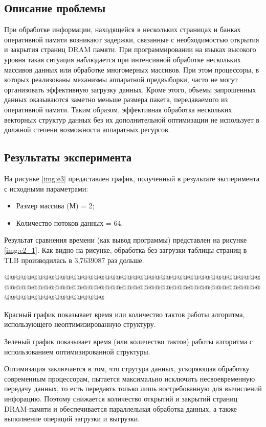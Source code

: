 \subsection*{Описание проблемы}
При обработке информации, находящейся в нескольких страницах и банках оперативной памяти возникают задержки, связанные с необходимостью открытия и закрытия страниц DRAM памяти. При программировании на языках высокого уровня такая ситуация наблюдается при интенсивной обработке нескольких массивов данных или обработке многомерных массивов. При этом процессоры, в которых реализованы механизмы аппаратной предвыборки, часто не могут организовать эффективную загрузку данных. Кроме этого, объемы запрошенных данных оказываются заметно меньше размера пакета, передаваемого из оперативной памяти. Таким образом, эффективная обработка нескольких векторных структур данных без их дополнительной оптимизации не использует в должной степени возможности аппаратных ресурсов. 

\subsection*{Результаты эксперимента}
На рисунке \ref{img:e3} предаставлен график, полученный в результате эксперимента с исходными параметрами:
\begin{itemize}
	\item Размер массива (М) = 2;
	\item Количество потоков данных = 64.
\end{itemize}


Результат сравнения времени (как вывод программы) представлен на рисунке \ref{img:e2_1}. Как видно на рисунке, обработка без загрузки таблицы страниц в TLB производилась в 3,7639087 раз дольше.

@@@@@@@@@@@@@@@@@@@@@@@@@@@@@@@@@@@@@@@@@@@@@@@@@@@@@@@@@@@@@@@@@@@@@@@@@@@@@@@@@@@@@@@@@@@@@@@@@@@@@@@@@@@@@@

Красный график показывает время или количество тактов работы алгоритма, использующего неоптимизированную структуру.

Зеленый график показывает время (или количество тактов) работы алгоритма с использованием оптимизированной структуры.

Оптимизация заключается в том, что струтура данных, ускоряющая обработку современным процессорам, пытается максимально исключить несвоевременную передачу данных, то есть передавть только лишь востребованную для вычислений инфорацию. Поэтому снижается количество открытий и закрытий страниц DRAM-памяти и обеспечивается параллельная обработка данных, а также выполнение операций загрузки и выгрузки.



